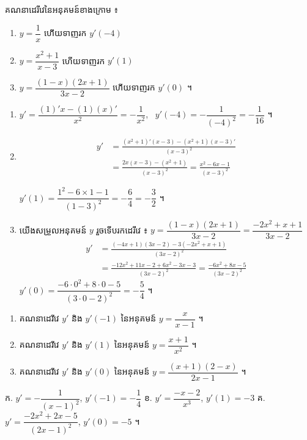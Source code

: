 \begin{example}[លំហាត់គំរូ]
គណនាដេរីវេនៃអនុគមន៍ខាងក្រោម ៖
\begin{enumerate}[a]
  \item $y = \dfrac{1}{x}$ ហើយទាញរក $y'(-4)$
  \item $y = \dfrac{x^2 + 1}{x - 3}$ ហើយទាញរក $y'(1)$
  \item $y = \dfrac{(1 - x)(2x + 1)}{3x - 2}$ ហើយទាញរក $y'(0)$ ។
\end{enumerate}
\end{example}
\ans
\begin{enumerate}[a]
  \item $y' = \dfrac{(1)'x - (1)(x)'}{x^2} = -\dfrac{1}{x^2}$, \ $y'(-4) = -\dfrac{1}{(-4)^2} = -\dfrac{1}{16}$ ។
  \item \[ \begin{aligned} y' &= \frac{(x^2 + 1)'(x - 3) - (x^2 + 1)(x - 3)'}{(x - 3)^2}\\ &= \frac{2x(x - 3) - (x^2 + 1)}{(x - 3)^2} = \frac{x^2 - 6x - 1}{(x - 3)^2} \end{aligned} \]

  $y'(1) = \dfrac{1^2 - 6\times 1 - 1}{(1 - 3)^2} = -\dfrac{6}{4} = -\dfrac{3}{2}$ ។
  \item យើងសម្រួលអនុគមន៍ $y$ រួចទើបរកដេរីវេ ៖ $y = \dfrac{(1 - x)(2x + 1)}{3x - 2} = \dfrac{-2x^2 + x + 1}{3x - 2}$
  \[ \begin{aligned} y' &= \frac{(-4x + 1)(3x - 2) - 3(-2x^2 + x + 1)}{(3x - 2)^2}\\ &= \frac{-12x^2 + 11x - 2 + 6x^2 - 3x - 3}{(3x - 2)^2} = \frac{-6x^2 + 8x - 5}{(3x - 2)^2} \end{aligned} \]
  $y'(0) = \dfrac{-6\cdot 0^2 + 8\cdot 0 - 5}{(3\cdot 0 - 2)^2} = -\dfrac{5}{4}$ ។
\end{enumerate}

\begin{pro}
\begin{enumerate}[a]
  \item គណនាដេរីវេ $y'$ និង $y'(-1)$ នៃអនុគមន៍ $y = \dfrac{x}{x - 1}$ ។
  \item គណនាដេរីវេ $y'$ និង $y'(1)$ នៃអនុគមន៍ $y = \dfrac{x + 1}{x^2}$ ។
  \item គណនាដេរីវេ $y'$ និង $y'(0)$ នៃអនុគមន៍ $y = \dfrac{(x + 1)(2 - x)}{2x - 1}$ ។
\end{enumerate}
\ans
ក. $y' = -\dfrac{1}{(x - 1)^2}$, $y'(-1) = -\dfrac{1}{4}$ \quad ខ. $y' = \dfrac{-x - 2}{x^3}$, $y'(1) = -3$ \quad គ. $y' = \dfrac{-2x^2 + 2x - 5}{(2x - 1)^2}$, $y'(0) = -5$ ។
\end{pro}

